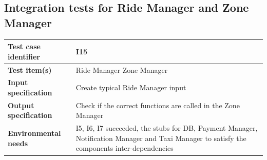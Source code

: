 \documentclass[a4paper,11pt]{report} %
\begin{document}
		\subsection{Integration tests for Ride Manager and Zone Manager}
			\begin{minipage}{\linewidth}
			\end{minipage}		
		\begin{center}
			\renewcommand{\arraystretch}{1.2}
			\setlength{\tabcolsep}{24pt}
			\begin{tabular}{ l  p{9cm}}\hline
				\textbf{Test case identifier} & I15\\\hline
				\textbf{Test item(s)} & Ride Manager \textrightarrow Zone Manager\\\hline
				\textbf{Input specification} & Create typical Ride Manager input \\\hline
				\textbf{Output specification} & Check if the correct functions are called in the Zone Manager\\\hline
				\textbf{Environmental needs} & I5, I6, I7 succeeded, the stubs for DB, Payment Manager, Notification Manager and Taxi Manager to satisfy the components inter-dependencies\\\hline
			\end{tabular}
		\end{center}	
		
\end{document}
